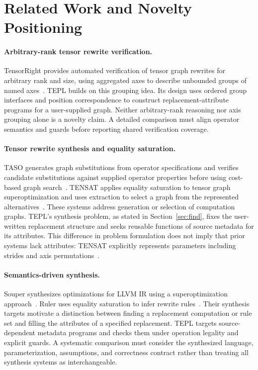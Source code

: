 \FloatBarrier
\section{Related Work and Novelty Positioning}
\label{sec:related-work}
\paragraph{Arbitrary-rank tensor rewrite verification.}
TensorRight provides automated verification of tensor graph rewrites for
arbitrary rank and size, using aggregated axes to describe unbounded groups
of named axes~\cite{tensorright}. TEPL builds on this grouping idea. Its
design uses ordered group interfaces and position correspondence to construct
replacement-attribute programs for a user-supplied graph. Neither arbitrary-rank
reasoning nor axis grouping alone is a novelty claim. A detailed comparison
must align operator semantics and guards before reporting shared verification
coverage. 

\paragraph{Tensor rewrite synthesis and equality saturation.}
TASO generates graph substitutions from operator specifications and verifies
candidate substitutions against supplied operator properties before using
cost-based graph search~\cite{taso}. TENSAT applies equality saturation to
tensor graph superoptimization and uses extraction to select a graph from the
represented alternatives~\cite{tensat}. These systems address generation or
selection of computation graphs. TEPL's synthesis problem, as stated in
Section~\ref{sec:find}, fixes the user-written replacement structure and seeks
reusable functions of source metadata for its attributes. This difference in
problem formulation does not imply that prior systems lack attributes:
TENSAT explicitly represents parameters including strides and axis
permutations~\cite{tensat}. 

\paragraph{Semantics-driven synthesis.}
Souper synthesizes optimizations for LLVM IR using a superoptimization
approach~\cite{souper}. Ruler uses equality saturation to infer rewrite
rules~\cite{ruler}. Their synthesis targets motivate a distinction between
finding a replacement computation or rule set and filling the attributes of
a specified replacement. TEPL targets source-dependent metadata programs and
checks them under operation legality and explicit guards. A systematic
comparison must consider the synthesized language, parameterization,
assumptions, and correctness contract rather than treating all synthesis
systems as interchangeable. 

